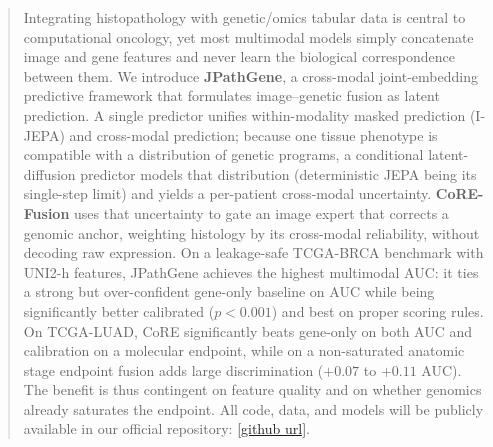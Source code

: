 \begin{abstract}
Integrating histopathology with genetic/omics tabular data is central to
computational oncology, yet most multimodal models simply concatenate image and gene
features and never learn the biological correspondence between them. We introduce
\textbf{JPathGene}, a cross-modal joint-embedding predictive framework that formulates
image--genetic fusion as latent prediction. A single predictor unifies within-modality
masked prediction (I-JEPA) and cross-modal prediction; because one tissue phenotype is
compatible with a distribution of genetic programs, a conditional latent-diffusion
predictor models that distribution (deterministic JEPA being its single-step limit)
and yields a per-patient cross-modal uncertainty. \textbf{CoRE-Fusion} uses that
uncertainty to gate an image expert that corrects a genomic anchor, weighting
histology by its cross-modal reliability, without decoding raw expression. On a leakage-safe
TCGA-BRCA benchmark with UNI2-h features, JPathGene achieves the highest multimodal AUC: it
ties a strong but over-confident gene-only baseline on AUC while being significantly
better calibrated ($p\!<\!0.001$) and best on proper scoring rules. On TCGA-LUAD, CoRE
significantly beats gene-only on both AUC and calibration on a molecular endpoint,
while on a non-saturated anatomic stage endpoint fusion adds large discrimination
($+0.07$ to $+0.11$ AUC). The benefit is thus contingent on feature quality and on
whether genomics already saturates the endpoint. All code, data, and models will be
publicly available in our official repository: \url{[github url]}.
\end{abstract}
